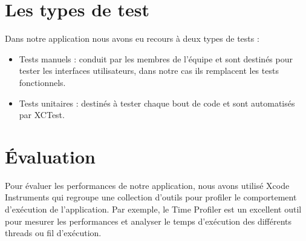 \section{Les types de test} %
\label{sub:tests}
Dans notre application nous avons eu recours à deux types de tests :
\begin{itemize}
	\item Tests manuels : conduit par les membres de l'équipe et sont destinés pour tester les interfaces utilisateurs, dans notre cas ils remplacent les tests fonctionnels.
	\item Tests unitaires : destinés à tester chaque bout de code et sont automatisés par XCTest.
\end{itemize}

\section{Évaluation} %
Pour évaluer les performances de notre application, nous avons utilisé Xcode Instruments qui regroupe une collection d'outils pour profiler le comportement d'exécution de l’application. Par exemple, le Time Profiler est un excellent outil pour mesurer les performances et analyser le temps d'exécution des différents threads ou fil d’exécution.
